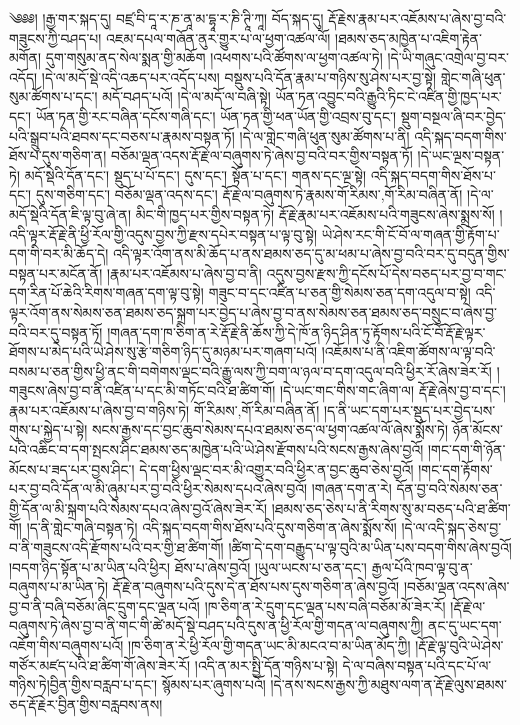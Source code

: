 ༄༅༅། །རྒྱ་གར་སྐད་དུ། བཛྲ་བི་དཱ་ར་ཎ་ནཱ་མ་དྷཱ་ར་ཎི་ཊཱི་ཀཱ། བོད་སྐད་དུ། རྡོ་རྗེས་རྣམ་པར་འཇོམས་པ་ཞེས་བྱ་བའི་གཟུངས་ཀྱི་བཤད་པ། འཇམ་དཔལ་གཞོན་ནུར་གྱུར་པ་ལ་ཕྱག་འཚལ་ལོ། །ཐམས་ཅད་མཁྱེན་པ་འཇིག་རྟེན་མགོན། དུག་གསུམ་ནད་སེལ་སྨན་གྱི་མཆོག །འཕགས་པའི་ཚོགས་ལ་ཕྱག་འཚལ་ཏེ། །དེ་ཡི་གཞུང་འགྲེལ་བྱ་བར་འདོད། །དེ་ལ་མདོ་སྡེ་འདི་འཆད་པར་འདོད་པས། བསྡུས་པའི་དོན་རྣམ་པ་གཉིས་སུ་ཤེས་པར་བྱ་སྟེ། གླེང་གཞི་ཕུན་སུམ་ཚོགས་པ་དང་། མདོ་བཤད་པའོ། །དེ་ལ་མདོ་ལ་བཞི་སྟེ། ཡོན་ཏན་འབྱུང་བའི་རྒྱུའི་ཏིང་ངེ་འཛིན་གྱི་ཁྱད་པར་དང་། ཡོན་ཏན་གྱི་རང་བཞིན་དངོས་གཞི་དང་། ཡོན་ཏན་གྱི་ཕན་ཡོན་གྱི་འབྲས་བུ་དང་། སྡུག་བསྔལ་ཞི་བར་བྱེད་པའི་སྒྲུབ་པའི་ཐབས་དང་བཅས་པ་རྣམས་བསྟན་ཏོ། །དེ་ལ་གླེང་གཞི་ཕུན་སུམ་ཚོགས་པ་ནི། འདི་སྐད་བདག་གིས་ཐོས་པ་དུས་གཅིག་ན། བཅོམ་ལྡན་འདས་རྡོ་རྗེ་ལ་བཞུགས་ཏེ་ཞེས་བྱ་བའི་བར་གྱིས་བསྟན་ཏོ། །དེ་ཡང་ལྔས་བསྟན་ཏེ། མདོ་སྡེའི་དོན་དང་། སྡུད་པ་པོ་དང་། དུས་དང་། སྟོན་པ་དང་། གནས་དང་ལྔ་སྟེ། འདི་སྐད་བདག་གིས་ཐོས་པ་དང་། དུས་གཅིག་དང་། བཅོམ་ལྡན་འདས་དང་། རྡོ་རྗེ་ལ་བཞུགས་ཏེ་རྣམས་{གོ་རིམས་,གོ་རིམ་}བཞིན་ནོ། །དེ་ལ་མདོ་སྡེའི་དོན་ཇི་ལྟ་བུ་ཞེ་ན། མིང་གི་ཁྱད་པར་གྱིས་བསྟན་ཏེ། རྡོ་རྗེ་རྣམ་པར་འཇོམས་པའི་གཟུངས་ཞེས་སྨྲས་སོ། །འདི་ལྟར་རྡོ་རྗེ་ནི་ཕྱི་རོལ་གྱི་འདུས་བྱས་ཀྱི་རྫས་དཔེར་བསྟན་པ་ལྟ་བུ་སྟེ། ཡེ་ཤེས་རང་གི་ངོ་བོ་ལ་གཞན་གྱི་རྟོག་པ་དག་གི་བར་མི་ཆོད་དེ། འདི་ལྟར་འོག་ནས་མི་ཆོད་པ་ནས་ཐམས་ཅད་དུ་མ་ཕམ་པ་ཞེས་བྱ་བའི་བར་དུ་བདུན་གྱིས་བསྟན་པར་མངོན་ནོ། །རྣམ་པར་འཇོམས་པ་ཞེས་བྱ་བ་ནི། འདུས་བྱས་རྫས་ཀྱི་དངོས་པོ་དེས་བཅད་པར་བྱ་བ་གང་དག་རིན་པོ་ཆེའི་རིགས་གཞན་དག་ལྟ་བུ་སྟེ། གཟུང་བ་དང་འཛིན་པ་ཅན་གྱི་སེམས་ཅན་དག་འདུལ་བ་སྟེ། འདི་ལྟར་འོག་ནས་སེམས་ཅན་ཐམས་ཅད་སྐྲག་པར་བྱེད་པ་ཞེས་བྱ་བ་ནས་སེམས་ཅན་ཐམས་ཅད་བསྲུང་བ་ཞེས་བྱ་བའི་བར་དུ་བསྟན་ཏོ། །གཞན་དག་ཁ་ཅིག་ན་རེ་རྡོ་རྗེ་ནི་ཆོས་ཀྱི་དེ་ཁོ་ན་ཉིད་ཤིན་ཏུ་རྟོགས་པའི་ངོ་བོ་རྡོ་རྗེ་ལྟར་ཐོགས་པ་མེད་པའི་ཡེ་ཤེས་སུ་རྩེ་གཅིག་ཉིད་དུ་མཉམ་པར་གཞག་པའོ། །འཇོམས་པ་ནི་འཇིག་ཚོགས་ལ་ལྟ་བའི་བསམ་པ་ཅན་གྱིས་ཕྱི་ནང་གི་བགེགས་ལྡང་བའི་རྒྱུ་ལས་ཀྱི་བག་ལ་ཉལ་བ་དག་འདུལ་བའི་ཕྱིར་རོ་ཞེས་ཟེར་རོ། །གཟུངས་ཞེས་བྱ་བ་ནི་འཛིན་པ་དང་མི་གཏོང་བའི་ཐ་ཚིག་གོ། །དེ་ཡང་གང་གིས་གང་ཞིག་ལ། རྡོ་རྗེ་ཞེས་བྱ་བ་དང་། རྣམ་པར་འཇོམས་པ་ཞེས་བྱ་བ་གཉིས་ཏེ། {གོ་རིམས་,གོ་རིམ་}བཞིན་ནོ། །ད་ནི་ཡང་དག་པར་སྡུད་པར་བྱེད་པས་གུས་པ་སྐྱེད་པ་སྟེ། སངས་རྒྱས་དང་བྱང་ཆུབ་སེམས་དཔའ་ཐམས་ཅད་ལ་ཕྱག་འཚལ་ལོ་ཞེས་སྨོས་ཏེ། ཉོན་མོངས་པའི་འཆིང་བ་དག་སྤངས་ཤིང་ཐམས་ཅད་མཁྱེན་པའི་ཡེ་ཤེས་རྫོགས་པའི་སངས་རྒྱས་ཞེས་བྱའོ། །གང་དག་གི་ཉོན་མོངས་པ་ཟད་པར་བྱས་ཤིང་། དེ་དག་ཕྱིས་ལྡང་བར་མི་འགྱུར་བའི་ཕྱིར་ན་བྱང་ཆུབ་ཅེས་བྱའོ། །གང་དག་རྟོགས་པར་བྱ་བའི་དོན་ལ་མི་ཞུམ་པར་བྱ་བའི་ཕྱིར་སེམས་དཔའ་ཞེས་བྱའོ། །གཞན་དག་ན་རེ། དོན་བྱ་བའི་སེམས་ཅན་གྱི་དོན་ལ་མི་སྐྲག་པའི་སེམས་དཔའ་ཞེས་བྱའོ་ཞེས་ཟེར་རོ། །ཐམས་ཅད་ཅེས་པ་ནི་རིགས་སུ་མ་བཅད་པའི་ཐ་ཚིག་གོ། །ད་ནི་གླེང་གཞི་བསྟན་ཏེ། འདི་སྐད་བདག་གིས་ཐོས་པའི་དུས་གཅིག་ན་ཞེས་སྨོས་སོ། །དེ་ལ་འདི་སྐད་ཅེས་བྱ་བ་ནི་གཟུངས་འདི་རྫོགས་པའི་བར་གྱི་ཐ་ཚིག་གོ། །ཚིག་དེ་དག་བརྒྱུད་པ་ལྟ་བུའི་མ་ཡིན་པས་བདག་གིས་ཞེས་བྱའོ། །བདག་ཉིད་སྟོན་པ་མ་ཡིན་པའི་ཕྱིར། ཐོས་པ་ཞེས་བྱའོ། །ཡུལ་ཡངས་པ་ཅན་དང་། རྒྱལ་པོའི་ཁབ་ལྟ་བུ་ན་བཞུགས་པ་མ་ཡིན་ཏེ། རྡོ་རྗེ་ན་བཞུགས་པའི་དུས་དེ་ན་ཐོས་པས་དུས་གཅིག་ན་ཞེས་བྱའོ། །བཅོམ་ལྡན་འདས་ཞེས་བྱ་བ་ནི་བཞི་བཅོམ་ཞིང་དྲུག་དང་ལྡན་པའོ། །ཁ་ཅིག་ན་རེ་དྲུག་དང་ལྡན་པས་བཞི་བཅོམ་མོ་ཟེར་རོ། །རྡོ་རྗེ་ལ་བཞུགས་ཏེ་ཞེས་བྱ་བ་ནི་གང་གི་ཚེ་མདོ་སྡེ་བཤད་པའི་དུས་ན་ཕྱི་རོལ་གྱི་གདན་ལ་བཞུགས་ཀྱི། ནང་དུ་ཡང་དག་འཇོག་གིས་བཞུགས་པའོ། །ཁ་ཅིག་ན་རེ་ཕྱི་རོལ་གྱི་གདན་ཡང་མི་མངའ་བ་མ་ཡིན་མོད་ཀྱི། །རྡོ་རྗེ་ལྟ་བུའི་ཡེ་ཤེས་གཙོར་མཛད་པའི་ཐ་ཚིག་གོ་ཞེས་ཟེར་རོ། །འདི་ན་མར་སྤྱི་དོན་གཉིས་པ་སྟེ། དེ་ལ་བཞིས་བསྟན་པའི་དང་པོ་ལ་གཉིས་ཏེ།བྱིན་གྱིས་བརླབ་པ་དང་། སྙོམས་པར་ཞུགས་པའོ། །དེ་ནས་སངས་རྒྱས་ཀྱི་མཐུས་ལག་ན་རྡོ་རྗེ་ལུས་ཐམས་ཅད་རྡོ་རྗེར་བྱིན་གྱིས་བརླབས་ནས། 